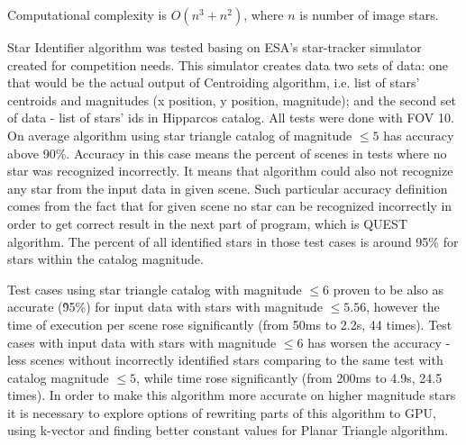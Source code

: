 \documentclass[12pt,a4paper,twoside]{article}
\begin{document}
Computational complexity is $O(n^3+n^2)$, where $n$ is number of image stars.

Star Identifier algorithm was tested basing on ESA's star-tracker simulator created for competition needs\cite{esa-competition}. This simulator creates data two sets of data: one that would be the actual output of Centroiding algorithm, i.e. list of stars' centroids and magnitudes (x position, y position, magnitude); and the second set of data - list of stars' ids in Hipparcos catalog.
All tests were done with FOV 10\degree . On average algorithm using star triangle catalog of magnitude $\leqslant 5$ has accuracy above 90\%. Accuracy in this case means the percent of scenes in tests where no star was recognized incorrectly. It means that algorithm could also not recognize any star from the input data in given scene.
Such particular accuracy definition comes from the fact that for given scene no star can be recognized incorrectly in order to get correct result in the next part of program, which is QUEST algorithm. The percent of all identified stars in those test cases is around 95\% for stars within the catalog magnitude.

Test cases using star triangle catalog with magnitude $\leqslant 6$ proven to be also as accurate (\~95\%) for input data with stars with magnitude $\leqslant 5.56$, however the time of execution per scene rose significantly (from 50ms to 2.2s, 44 times). Test cases with input data with stars with magnitude $\leqslant 6$ has worsen the accuracy - less scenes without incorrectly identified stars comparing to the same test with catalog magnitude $\leqslant 5$, while time rose significantly (from 200ms to 4.9s, 24.5 times). In order to make this algorithm more accurate on higher magnitude stars it is necessary to explore options of rewriting parts of this algorithm to GPU, using k-vector and finding better constant values for Planar Triangle algorithm.
\end{document}

